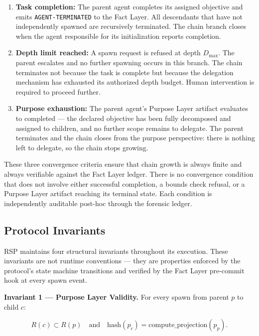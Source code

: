 \begin{enumerate}
  \item[(CC-1)] \textbf{Task completion:} The parent agent completes its assigned objective and emits \texttt{AGENT-TERMINATED} to the Fact Layer. All descendants that have not independently spawned are recursively terminated. The chain branch closes when the agent responsible for its initialization reports completion.
  
  \item[(CC-2)] \textbf{Depth limit reached:} A spawn request is refused at depth $D_{\max}$. The parent escalates and no further spawning occurs in this branch. The chain terminates not because the task is complete but because the delegation mechanism has exhausted its authorized depth budget. Human intervention is required to proceed further.
  
  \item[(CC-3)] \textbf{Purpose exhaustion:} The parent agent's Purpose Layer artifact evaluates to completed — the declared objective has been fully decomposed and assigned to children, and no further scope remains to delegate. The parent terminates and the chain closes from the purpose perspective: there is nothing left to delegate, so the chain stops growing.
\end{enumerate}

These three convergence criteria ensure that chain growth is always finite and always verifiable against the Fact Layer ledger. There is no convergence condition that does not involve either successful completion, a bounds check refusal, or a Purpose Layer artifact reaching its terminal state. Each condition is independently auditable post-hoc through the forensic ledger.

\subsection{Protocol Invariants}

RSP maintains four structural invariants throughout its execution. These invariants are not runtime conventions — they are properties enforced by the protocol's state machine transitions and verified by the Fact Layer pre-commit hook at every spawn event.

\bigskip
\noindent\textbf{Invariant 1 — Purpose Layer Validity.} For every spawn from parent $p$ to child $c$:

\begin{equation}
R(c) \subset R(p)\quad \text{and} \quad \mathrm{hash}(p_c) = \mathrm{compute\_projection}(p_p).
\label{eq:rs-inv-purpose}
\end{equation}

